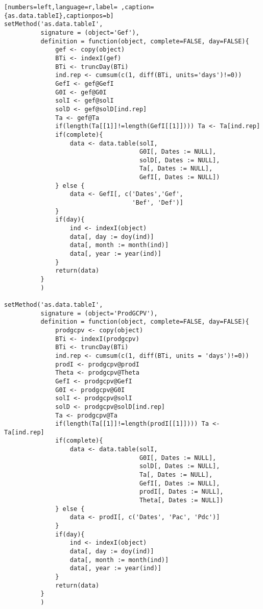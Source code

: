 \begin{lstlisting}[numbers=left,language=r,label= ,caption={as.data.tableI},captionpos=b]
setMethod('as.data.tableI',
          signature = (object='Gef'),
          definition = function(object, complete=FALSE, day=FALSE){
              gef <- copy(object)
              BTi <- indexI(gef)
              BTi <- truncDay(BTi)
              ind.rep <- cumsum(c(1, diff(BTi, units='days')!=0))
              GefI <- gef@GefI
              G0I <- gef@G0I
              solI <- gef@solI
              solD <- gef@solD[ind.rep]
              Ta <- gef@Ta
              if(length(Ta[[1]]!=length(GefI[[1]]))) Ta <- Ta[ind.rep]
              if(complete){
                  data <- data.table(solI,
                                     G0I[, Dates := NULL],
                                     solD[, Dates := NULL],
                                     Ta[, Dates := NULL],
                                     GefI[, Dates := NULL])
              } else {
                  data <- GefI[, c('Dates','Gef',
                                   'Bef', 'Def')]
              }
              if(day){
                  ind <- indexI(object)
                  data[, day := doy(ind)]
                  data[, month := month(ind)]
                  data[, year := year(ind)]
              }
              return(data)
          }
          )

setMethod('as.data.tableI',
          signature = (object='ProdGCPV'),
          definition = function(object, complete=FALSE, day=FALSE){
              prodgcpv <- copy(object)
              BTi <- indexI(prodgcpv)
              BTi <- truncDay(BTi)
              ind.rep <- cumsum(c(1, diff(BTi, units = 'days')!=0))
              prodI <- prodgcpv@prodI
              Theta <- prodgcpv@Theta
              GefI <- prodgcpv@GefI
              G0I <- prodgcpv@G0I
              solI <- prodgcpv@solI
              solD <- prodgcpv@solD[ind.rep]
              Ta <- prodgcpv@Ta
              if(length(Ta[[1]]!=length(prodI[[1]]))) Ta <- Ta[ind.rep]
              if(complete){
                  data <- data.table(solI,
                                     G0I[, Dates := NULL],
                                     solD[, Dates := NULL],
                                     Ta[, Dates := NULL],
                                     GefI[, Dates := NULL],
                                     prodI[, Dates := NULL],
                                     Theta[, Dates := NULL])
              } else {
                  data <- prodI[, c('Dates', 'Pac', 'Pdc')]
              }
              if(day){
                  ind <- indexI(object)
                  data[, day := doy(ind)]
                  data[, month := month(ind)]
                  data[, year := year(ind)]
              }
              return(data)
          }
          )


\end{lstlisting}
